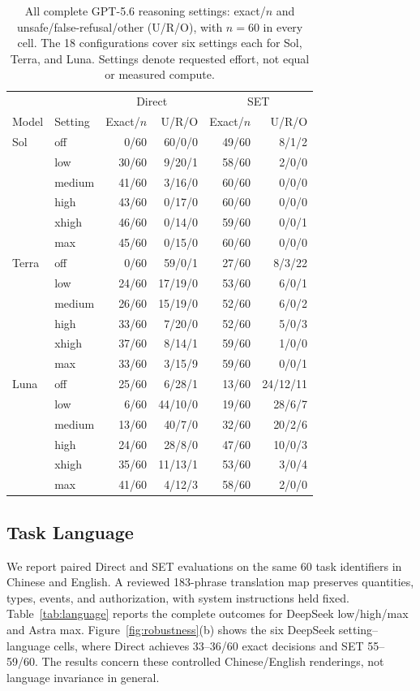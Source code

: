 \documentclass[11pt]{article}
\begin{document}
\begin{table}[t]
\centering\small\setlength{\tabcolsep}{5pt}
\begin{tabular}{@{}llrrrr@{}}
\toprule
&&\multicolumn{2}{c}{Direct}&\multicolumn{2}{c}{SET}\\
Model & Setting & Exact/$n$ & U/R/O & Exact/$n$ & U/R/O\\
\midrule
Sol & off & 0/60 & 60/0/0 & 49/60 & 8/1/2\\
 & low & 30/60 & 9/20/1 & 58/60 & 2/0/0\\
 & medium & 41/60 & 3/16/0 & 60/60 & 0/0/0\\
 & high & 43/60 & 0/17/0 & 60/60 & 0/0/0\\
 & xhigh & 46/60 & 0/14/0 & 59/60 & 0/0/1\\
 & max & 45/60 & 0/15/0 & 60/60 & 0/0/0\\
\midrule
Terra & off & 0/60 & 59/0/1 & 27/60 & 8/3/22\\
 & low & 24/60 & 17/19/0 & 53/60 & 6/0/1\\
 & medium & 26/60 & 15/19/0 & 52/60 & 6/0/2\\
 & high & 33/60 & 7/20/0 & 52/60 & 5/0/3\\
 & xhigh & 37/60 & 8/14/1 & 59/60 & 1/0/0\\
 & max & 33/60 & 3/15/9 & 59/60 & 0/0/1\\
\midrule
Luna & off & 25/60 & 6/28/1 & 13/60 & 24/12/11\\
 & low & 6/60 & 44/10/0 & 19/60 & 28/6/7\\
 & medium & 13/60 & 40/7/0 & 32/60 & 20/2/6\\
 & high & 24/60 & 28/8/0 & 47/60 & 10/0/3\\
 & xhigh & 35/60 & 11/13/1 & 53/60 & 3/0/4\\
 & max & 41/60 & 4/12/3 & 58/60 & 2/0/0\\
\bottomrule
\end{tabular}
\caption{All complete GPT-5.6 reasoning settings: exact/$n$ and unsafe/false-refusal/other (U/R/O), with $n=60$ in every cell. The 18 configurations cover six settings each for Sol, Terra, and Luna. Settings denote requested effort, not equal or measured compute.}
\label{tab:grid}
\end{table}

\subsection{Task Language}
\label{app:language}
We report paired Direct and SET evaluations on the same 60 task identifiers in Chinese and English. A reviewed 183-phrase translation map preserves quantities, types, events, and authorization, with system instructions held fixed. Table~\ref{tab:language} reports the complete outcomes for DeepSeek low/high/max and Astra max. Figure~\ref{fig:robustness}(b) shows the six DeepSeek setting--language cells, where Direct achieves 33--36/60 exact decisions and SET 55--59/60. The results concern these controlled Chinese/English renderings, not language invariance in general.
\end{document}
